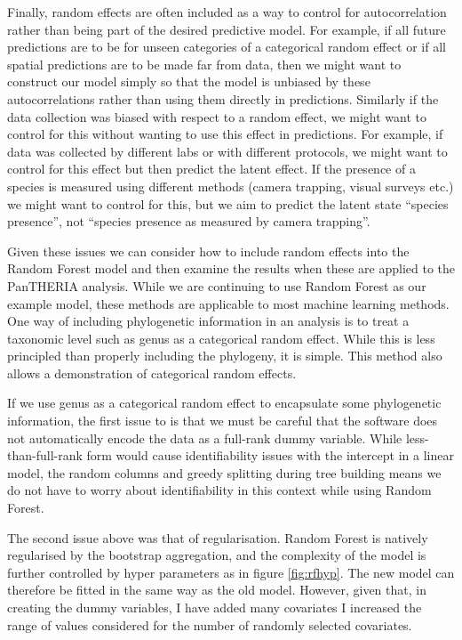 \documentclass[12pt,]{article}
\begin{document}
Finally, random effects are often included as a way to control for autocorrelation rather than being part of the desired predictive model.
For example, if all future predictions are to be for unseen categories of a categorical random effect or if all spatial predictions are to be made far from data, then we might want to construct our model simply so that the model is unbiased by these autocorrelations rather than using them directly in predictions.
Similarly if the data collection was biased with respect to a random effect, we might want to control for this without wanting to use this effect in predictions.
For example, if data was collected by different labs or with different protocols, we might want to control for this effect but then predict the latent effect.
If the presence of a species is measured using different methods (camera trapping, visual surveys etc.) we might want to control for this, but we aim to predict the latent state ``species presence'', not ``species presence as measured by camera trapping''.


Given these issues we can consider how to include random effects into the Random Forest model and then examine the results when these are applied to the PanTHERIA analysis.
While we are continuing to use Random Forest as our example model, these methods are applicable to most machine learning methods.
One way of including phylogenetic information in an analysis is to treat a taxonomic level such as genus as a categorical random effect.
While this is less principled than properly including the phylogeny, it is simple.
This method also allows a demonstration of categorical random effects.

If we use genus as a categorical random effect to encapsulate some phylogenetic information, the first issue to is that we must be careful that the software does not automatically encode the data as a full-rank dummy variable.
While less-than-full-rank form would cause identifiability issues with the intercept in a linear model, the random columns and greedy splitting during tree building means we do not have to worry about identifiability in this context while using Random Forest.

The second issue above was that of regularisation.
Random Forest is natively regularised by the bootstrap aggregation, and the complexity of the model is further controlled by hyper parameters as in figure \ref{fig:rfhyp}.
The new model can therefore be fitted in the same way as the old model.
However, given that, in creating the dummy variables, I have added many covariates I increased the range of values considered for the number of randomly selected covariates.
\end{document}
